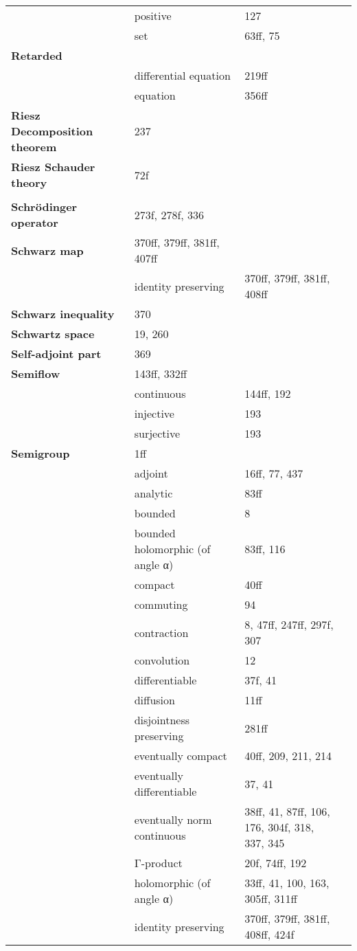 \documentclass[10pt]{scrartcl}
\begin{document}
\begin{longtable}{>{\bfseries}p{4cm}p{4cm}p{4cm}p{4cm}}
	& positive 	& 127 \\
	& set 	& 63ff, 75 \\
Retarded 	& \\
	& differential equation 	& 219ff \\
	& equation 	& 356ff \\
Riesz Decomposition theorem 	& 237 \\
Riesz Schauder theory 	& 72f \\
	& \\
Schrödinger operator 	& 273f, 278f, 336 \\
Schwarz map 	& 370ff, 379ff, 381ff, 407ff \\
	& identity preserving 	& 370ff, 379ff, 381ff, 408ff \\
Schwarz inequality 	& 370 \\
Schwartz space 	& 19, 260 \\
Self-adjoint part 	& 369 \\
Semiflow 	& 143ff, 332ff \\
	& continuous 	& 144ff, 192 \\
	& injective 	& 193 \\
	& surjective 	& 193 \\
Semigroup 	& 1ff \\
	& adjoint 	& 16ff, 77, 437 \\
	& analytic 	& 83ff \\
	& bounded 	& 8 \\
	& bounded holomorphic (of angle α) 	& 83ff, 116 \\
	& compact 	& 40ff \\
	& commuting 	& 94 \\
	& contraction 	& 8, 47ff, 247ff, 297f, 307 \\
	& convolution 	& 12 \\
	& differentiable 	& 37f, 41 \\
	& diffusion 	& 11ff \\
	& disjointness preserving 	& 281ff \\
	& eventually compact 	& 40ff, 209, 211, 214 \\
	& eventually differentiable 	& 37, 41 \\
	& eventually norm continuous 	& 38ff, 41, 87ff, 106, 176, 304f, 318, 337, 345 \\
	& Γ-product 	& 20f, 74ff, 192 \\
	& holomorphic (of angle α) 	& 33ff, 41, 100, 163, 305ff, 311ff \\
	& identity preserving 	& 370ff, 379ff, 381ff, 408ff, 424f \\

\end{longtable}
\end{document}
